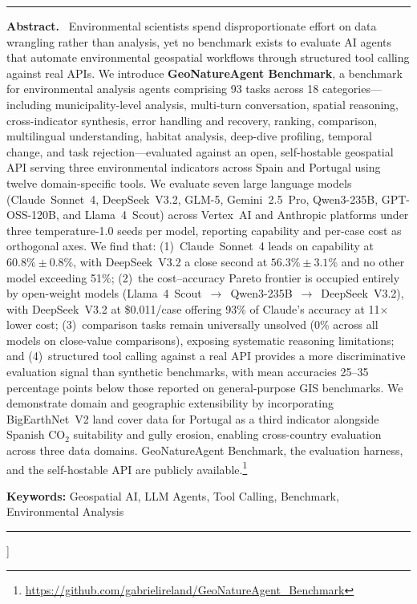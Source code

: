 \documentclass[10pt,twocolumn]{article}
\begin{document}
\begin{@twocolumnfalse}
\noindent\rule{\textwidth}{0.4pt}
\vspace{4pt}
\noindent\textbf{Abstract.}~
Environmental scientists spend disproportionate effort on data wrangling rather than analysis, yet no benchmark exists to evaluate AI agents that automate environmental geospatial workflows through structured tool calling against real APIs. We introduce \textbf{GeoNatureAgent Benchmark}, a benchmark for environmental analysis agents comprising 93 tasks across 18 categories---including municipality-level analysis, multi-turn conversation, spatial reasoning, cross-indicator synthesis, error handling and recovery, ranking, comparison, multilingual understanding, habitat analysis, deep-dive profiling, temporal change, and task rejection---evaluated against an open, self-hostable geospatial API serving three environmental indicators across Spain and Portugal using twelve domain-specific tools. We evaluate seven large language models (Claude~Sonnet~4, DeepSeek~V3.2, GLM-5, Gemini~2.5~Pro, Qwen3-235B, GPT-OSS-120B, and Llama~4~Scout) across Vertex~AI and Anthropic platforms under three temperature-1.0 seeds per model, reporting capability and per-case cost as orthogonal axes. We find that: (1)~Claude~Sonnet~4 leads on capability at $60.8\%\pm0.8\%$, with DeepSeek~V3.2 a close second at $56.3\%\pm3.1\%$ and no other model exceeding 51\%; (2)~the cost--accuracy Pareto frontier is occupied entirely by open-weight models (Llama~4~Scout~$\to$~Qwen3-235B~$\to$~DeepSeek~V3.2), with DeepSeek~V3.2 at \$0.011/case offering 93\% of Claude's accuracy at 11$\times$ lower cost; (3)~comparison tasks remain universally unsolved (0\% across all models on close-value comparisons), exposing systematic reasoning limitations; and (4)~structured tool calling against a real API provides a more discriminative evaluation signal than synthetic benchmarks, with mean accuracies 25--35 percentage points below those reported on general-purpose GIS benchmarks. We demonstrate domain and geographic extensibility by incorporating BigEarthNet~V2 land cover data for Portugal as a third indicator alongside Spanish CO$_2$ suitability and gully erosion, enabling cross-country evaluation across three data domains. GeoNatureAgent Benchmark, the evaluation harness, and the self-hostable API are publicly available.\footnote{\url{https://github.com/gabrielireland/GeoNatureAgent_Benchmark}}

\vspace{6pt}
\noindent\textbf{Keywords:} Geospatial AI, LLM Agents, Tool Calling, Benchmark, Environmental Analysis
\vspace{4pt}
\noindent\rule{\textwidth}{0.4pt}
\vspace{10pt}
\end{@twocolumnfalse}
]
\end{document}
